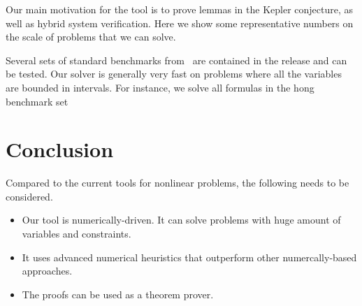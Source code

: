 \documentclass[envcountsect]{llncs}
\begin{document}
Our main motivation for the tool is to prove lemmas in the Kepler conjecture,
as well as hybrid system verification. Here we show some representative numbers
on the scale of problems that we can solve.



Several sets of standard benchmarks from~\cite{} are contained in the release
and can be tested. Our solver is generally very fast on problems where all the
variables are bounded in intervals. For instance, we solve all formulas in the
hong benchmark set~\cite{}



\section{Conclusion}
Compared to the current tools for nonlinear problems, the following needs to be
considered.
\begin{itemize}
\item Our tool is numerically-driven. It can solve problems with huge amount of variables and constraints.
\item It uses advanced numerical heuristics that outperform other
numercally-based approaches.
\item The proofs can be used as a theorem prover.
\end{itemize}




\end{document}
